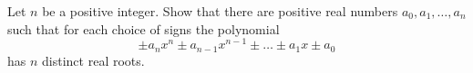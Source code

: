 Let \(n\) be a positive integer. Show that there are positive real numbers \(a_0, a_1, \dots, a_n\) such that for each choice of signs the polynomial
\[\pm a_nx^n\pm a_{n-1}x^{n-1} \pm \dots \pm a_1x \pm a_0\]has \(n\) distinct real roots.